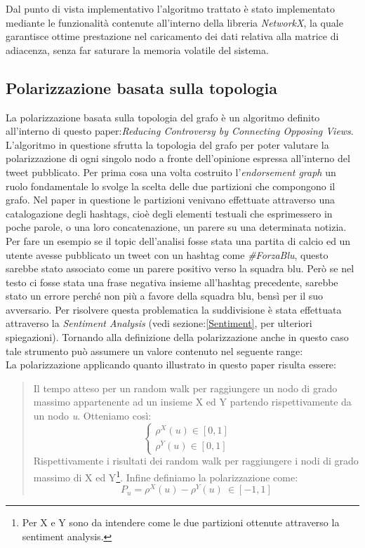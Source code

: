 Dal punto di vista implementativo l'algoritmo trattato è stato implementato mediante le funzionalità contenute all'interno della libreria \textit{NetworkX}, la quale garantisce ottime prestazione nel caricamento dei dati relativa alla matrice di adiacenza, senza far saturare la memoria volatile del sistema.
\newpage
\subsection{Polarizzazione basata sulla topologia}
La polarizzazione basata sulla topologia del grafo è un algoritmo definito all'interno di questo paper:\textit{Reducing Controversy by Connecting Opposing Views}.
L'algoritmo in questione sfrutta la topologia del grafo per poter valutare la polarizzazione di ogni singolo nodo a fronte dell'opinione espressa all'interno del tweet pubblicato.
Per prima cosa una volta costruito l'\textit{endorsement graph} un ruolo fondamentale lo svolge la scelta delle due partizioni che compongono il grafo.
Nel paper in questione le partizioni venivano effettuate attraverso una catalogazione degli hashtags, cioè degli elementi testuali che esprimessero in poche parole, o una loro concatenazione, un parere su una determinata notizia.\cite{Garimella2015polarization}
Per fare un esempio se il topic dell'analisi fosse stata una partita di calcio ed un utente avesse pubblicato un tweet con un hashtag come \textit{\#ForzaBlu}, questo sarebbe stato associato come un parere positivo verso la squadra blu. Però se nel testo ci fosse stata una frase negativa insieme all'hashtag precedente, sarebbe stato un errore perché non più a favore della squadra blu, bensì per il suo avversario. Per risolvere questa problematica la suddivisione è stata effettuata attraverso la \textit{Sentiment Analysis} (vedi sezione:\ref{Sentiment}, per ulteriori spiegazioni). 
Tornando alla definizione della polarizzazione anche in questo caso tale strumento può assumere un valore contenuto nel seguente range:
\begin{equation}
[-1,1]
\end{equation}
La polarizzazione applicando quanto illustrato in questo paper risulta essere:
\begin{quote}
Il tempo atteso per un random walk per raggiungere un nodo di grado massimo appartenente ad un insieme X ed Y partendo rispettivamente da un nodo \textit{u}. Otteniamo così:
\[
\begin{cases}
    \rho^{X}(u) \in [0,1]       & \quad \\
     \rho^{Y}(u) \in [0,1]   & \quad 
  \end{cases}
\]
Rispettivamente i risultati dei random walk per raggiungere i nodi di grado massimo di X ed Y\footnote{Per X e Y sono da intendere come le due partizioni ottenute attraverso la sentiment analysis.}. 
Infine definiamo la polarizzazione come:
\begin{equation}\label{polar}
P_{u}= \rho^{X}(u)-\rho^{Y}(u) \ \in [-1,1] 
\end{equation}
\end{quote}
